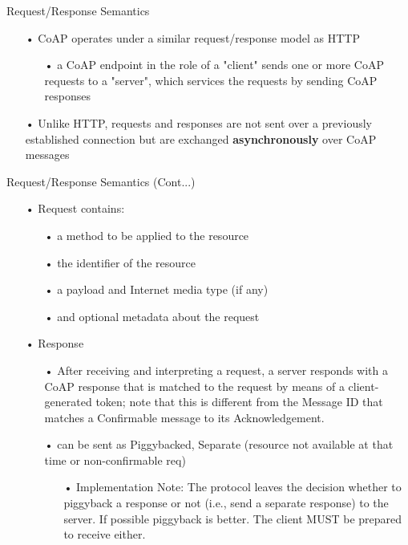 \documentclass[11pt]{beamer}
\begin{document}
\begin{frame}{Request/Response Semantics}
\begin{itemize}
\item[•] CoAP operates under a similar request/response model as HTTP
\begin{itemize}
\item[•] a CoAP endpoint in the role of a "client" sends one or more CoAP requests to a "server", which services the requests by sending CoAP responses
\end{itemize}
\item[•] Unlike HTTP, requests and responses are not sent over a previously established connection but are exchanged \textbf{asynchronously} over CoAP messages
\end{itemize}
\end{frame}
\begin{frame}{Request/Response Semantics (Cont...)}
\begin{itemize}
\item[•] Request contains:
\begin{itemize}
\item[•] a method to be applied to the resource
\item[•] the identifier of the resource
\item[•] a payload and Internet media type (if any)
\item[•] and optional metadata about the request
\end{itemize}
\item[•] Response
\begin{itemize}
\item[•] After receiving and interpreting a request, a server responds with a CoAP response that is matched to the request by means of a client-generated token; note that this is different from the Message ID that matches a Confirmable message to its Acknowledgement.
\item[•] can be sent as Piggybacked, Separate (resource not available at that time or non-confirmable req)
\begin{itemize}
\item[•] Implementation Note:  The protocol leaves the decision whether to piggyback a response or not (i.e., send a separate response) to the server. If possible piggyback is better. The client MUST be prepared to receive either. 
\end{itemize}
\end{itemize}
\end{itemize}
\end{frame}
\end{document}
